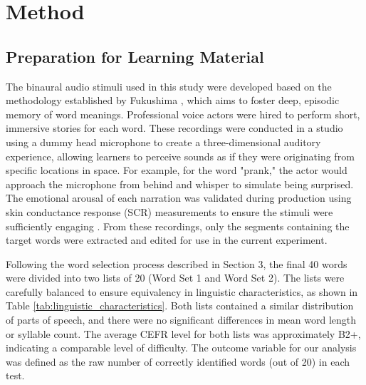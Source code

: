 \documentclass{ehissymp}
\begin{document}
\section{Method}
\subsection{Preparation for Learning Material}
The binaural audio stimuli used in this study were developed based on the methodology established by Fukushima \cite{Fukushima2019}, which aims to foster deep, episodic memory of word meanings. Professional voice actors were hired to perform short, immersive stories for each word. These recordings were conducted in a studio using a dummy head microphone to create a three-dimensional auditory experience, allowing learners to perceive sounds as if they were originating from specific locations in space. For example, for the word "prank," the actor would approach the microphone from behind and whisper to simulate being surprised. The emotional arousal of each narration was validated during production using skin conductance response (SCR) measurements to ensure the stimuli were sufficiently engaging \cite{Fukushima2019}. From these recordings, only the segments containing the target words were extracted and edited for use in the current experiment.

Following the word selection process described in Section 3, the final 40 words were divided into two lists of 20 (Word Set 1 and Word Set 2). The lists were carefully balanced to ensure equivalency in linguistic characteristics, as shown in Table \ref{tab:linguistic_characteristics}. Both lists contained a similar distribution of parts of speech, and there were no significant differences in mean word length or syllable count. The average CEFR level for both lists was approximately B2+, indicating a comparable level of difficulty. The outcome variable for our analysis was defined as the raw number of correctly identified words (out of 20) in each test.

\begin{table}[h!]
\centering
\caption{Linguistic characteristics of the two word lists.}
\label{tab:linguistic_characteristics}
\end{table}
\end{document}
